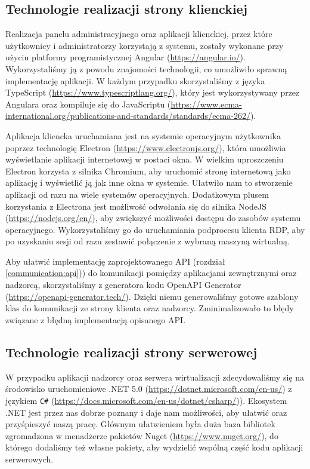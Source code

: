 \documentclass[../opis-rozwiazania.tex]{subfiles}
\begin{document}
\label{technologies}

\subsection{Technologie realizacji strony klienckiej}
Realizacja panelu administracyjnego oraz aplikacji klienckiej, przez które użytkownicy i administratorzy korzystają z systemu, zostały wykonane przy użyciu platformy programistycznej Angular (\url{https://angular.io/}).
Wykorzystaliśmy ją z powodu znajomości technologii, co umożliwiło sprawną implementację aplikacji.
W każdym przypadku skorzystaliśmy z języka TypeScript (\url{https://www.typescriptlang.org/}), który jest wykorzystywany przez Angulara oraz kompiluje się do JavaScriptu (\url{https://www.ecma-international.org/publications-and-standards/standards/ecma-262/}).

Aplikacja kliencka uruchamiana jest na systemie operacyjnym użytkownika poprzez technologię Electron (\url{https://www.electronjs.org/}), która umożliwia wyświetlanie aplikacji internetowej w postaci okna.
W wielkim uproszczeniu Electron korzysta z silnika Chromium, aby uruchomić stronę internetową jako aplikację i wyświetlić ją jak inne okna w systemie.
Ułatwiło nam to stworzenie aplikacji od razu na wiele systemów operacyjnych.
Dodatkowym plusem korzystania z Electrona jest możliwość odwołania się do silnika NodeJS (\url{https://nodejs.org/en/}), aby zwiększyć możliwości dostępu do zasobów systemu operacyjnego.
Wykorzystaliśmy go do uruchamiania podprocesu klienta RDP, aby po uzyskaniu sesji od razu zestawić połączenie z wybraną maszyną wirtualną.

Aby ułatwić implementację zaprojektowanego API (rozdział \ref{communication:api})) do komunikacji pomiędzy aplikacjami zewnętrznymi oraz nadzorcą, skorzystaliśmy z generatora kodu OpenAPI Generator (\url{https://openapi-generator.tech/}).
Dzięki niemu generowaliśmy gotowe szablony klas do komunikacji ze strony klienta oraz nadzorcy.
Zminimalizowało to błędy związane z błędną implementacją opisanego API.

\subsection{Technologie realizacji strony serwerowej}
W przypadku aplikacji nadzorcy oraz serwera wirtualizacji zdecydowaliśmy się na środowisko uruchomieniowe .NET 5.0 (\url{https://dotnet.microsoft.com/en-us/}) z językiem \texttt{C\#} (\url{https://docs.microsoft.com/en-us/dotnet/csharp/})).
Ekosystem .NET jest przez nas dobrze poznany i daje nam możliwości, aby ułatwić oraz przyśpieszyć naszą pracę.
Głównym ułatwieniem była duża baza bibliotek zgromadzona w menadżerze pakietów Nuget (\url{https://www.nuget.org/}), do którego dodaliśmy też własne pakiety, aby wydzielić wspólną część kodu aplikacji serwerowych.
\end{document}
